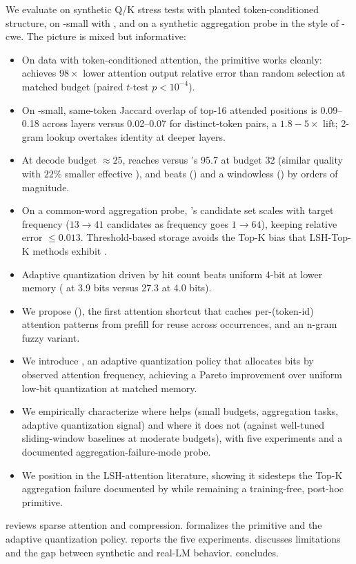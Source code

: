 We evaluate \hma on synthetic Q/K stress tests with planted token-conditioned structure, on \gpttwo-small with \wikitext, and on a synthetic aggregation probe in the style of -cwe. The picture is mixed but informative:
\begin{itemize}[leftmargin=*,itemsep=0pt,topsep=0pt]
    \item On data with token-conditioned attention, the primitive works cleanly: \hma achieves $98\times$ lower attention output relative error than random selection at matched budget (paired $t$-test $p<10^{-4}$).
    \item On \gpttwo-small, same-token Jaccard overlap of top-16 attended positions is 0.09--0.18 across layers versus 0.02--0.07 for distinct-token pairs, a $1.8{-}5\times$ lift; 2-gram lookup overtakes identity at deeper layers.
    \item At decode budget $\approx 25$, \hmaid reaches  versus \streaming's 95.7 at budget 32 (\ie similar quality with $22\%$ smaller effective \kvcache), and beats \randomb () and a windowless \hto () by orders of magnitude.
    \item On a common-word aggregation probe, \hma's candidate set scales with target frequency ($13 \to 41$ candidates as frequency goes $1 \to 64$), keeping relative error $\leq 0.013$. Threshold-based storage avoids the Top-K bias that LSH-Top-K methods exhibit \citep{chen2024magicpig}.
    \item Adaptive \kvcache quantization driven by \hma hit count beats uniform 4-bit at lower memory ( at 3.9 bits versus 27.3 at 4.0 bits).
\end{itemize}

\begin{itemize}[leftmargin=*,itemsep=0pt,topsep=0pt]
    \item We propose \ours (\hma), the first attention shortcut that caches per-(token-id) attention patterns from prefill for reuse across occurrences, and an n-gram fuzzy variant.
    \item We introduce \hmaquant, an adaptive \kvcache quantization policy that allocates bits by observed attention frequency, achieving a Pareto improvement over uniform low-bit quantization at matched memory.
    \item We empirically characterize where \hma helps (small budgets, aggregation tasks, adaptive quantization signal) and where it does not (against well-tuned sliding-window baselines at moderate budgets), with five experiments and a documented aggregation-failure-mode probe.
    \item We position \hma in the LSH-attention literature, showing it sidesteps the Top-K aggregation failure documented by \magicpig while remaining a training-free, post-hoc primitive.
\end{itemize}

  reviews sparse attention and \kvcache compression.  formalizes the \hma primitive and the adaptive quantization policy.  reports the five experiments.  discusses limitations and the gap between synthetic and real-LM behavior.  concludes.
